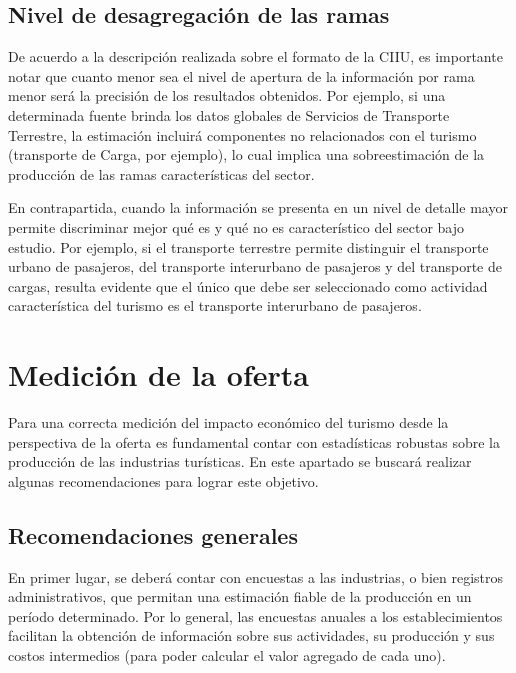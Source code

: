 \documentclass[
  openany]{book}
\begin{document}
\hypertarget{nivel-de-desagregacion-de-las-ramas}{%
\subsection{Nivel de desagregación de las ramas}\label{nivel-de-desagregacion-de-las-ramas}}

De acuerdo a la descripción realizada sobre el formato de la CIIU, es importante notar que cuanto menor sea el nivel de apertura de la información por rama menor será la precisión de los resultados obtenidos. Por ejemplo, si una determinada fuente brinda los datos globales de Servicios de Transporte Terrestre, la estimación incluirá componentes no relacionados con el turismo (transporte de Carga, por ejemplo), lo cual implica una sobreestimación de la producción de las ramas características del sector.

En contrapartida, cuando la información se presenta en un nivel de detalle mayor permite discriminar mejor qué es y qué no es característico del sector bajo estudio. Por ejemplo, si el transporte terrestre permite distinguir el transporte urbano de pasajeros, del transporte interurbano de pasajeros y del transporte de cargas, resulta evidente que el único que debe ser seleccionado como actividad característica del turismo es el transporte interurbano de pasajeros.

\hypertarget{medicion-de-la-oferta}{%
\section{Medición de la oferta}\label{medicion-de-la-oferta}}

Para una correcta medición del impacto económico del turismo desde la perspectiva de la oferta es fundamental contar con estadísticas robustas sobre la producción de las industrias turísticas. En este apartado se buscará realizar algunas recomendaciones para lograr este objetivo.

\hypertarget{recomendaciones-generales}{%
\subsection{Recomendaciones generales}\label{recomendaciones-generales}}

En primer lugar, se deberá contar con encuestas a las industrias, o bien registros administrativos, que permitan una estimación fiable de la producción en un período determinado. Por lo general, las encuestas anuales a los establecimientos facilitan la obtención de información sobre sus actividades, su producción y sus costos intermedios (para poder calcular el valor agregado de cada uno).
\end{document}

